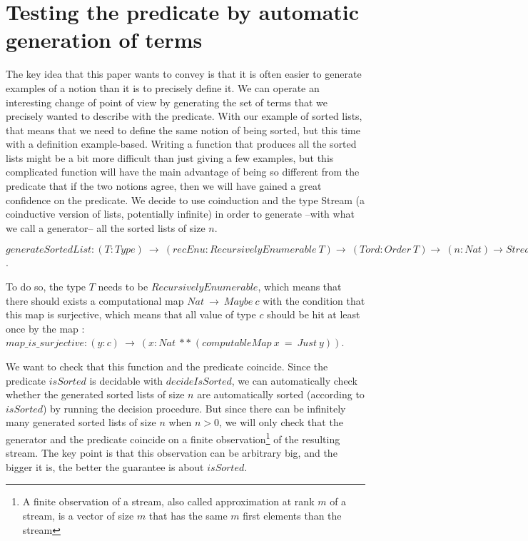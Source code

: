 \section{Testing the predicate by automatic generation of terms}

\label{sect:testingInside}

The key idea that this paper wants to convey is that it is often easier to generate examples of a notion than it is to precisely define it. We can operate an interesting change of point of view by generating the set of terms that we precisely wanted to describe with the predicate. With our example of sorted lists, that means that we need to define the same notion of being sorted, but this time with a definition example-based. Writing a function that produces all the sorted lists might be a bit more difficult than just giving a few examples, but this complicated function will have the main advantage of being so different from the predicate that if the two notions agree, then we will have gained a great confidence on the predicate. We decide to use coinduction and the type Stream (a coinductive version of lists, potentially infinite) in order to generate --with what we call a generator-- all the sorted lists of size $n$.

$generateSortedList : (T:Type)\ \rightarrow\ (recEnu:RecursivelyEnumerable\ T) \rightarrow\ (Tord : Order\ T) \rightarrow\ (n:Nat) \rightarrow Stream\ (List\ T)$.

To do so, the type $T$ needs to be $RecursivelyEnumerable$, which means that there should exists a computational map $Nat\ \rightarrow\ Maybe\ c$ with the condition that this map is surjective, which means that all value of type $c$ should be hit at least once by the map : $map\_is\_surjective : (y:c)\ \rightarrow\ (x:Nat\ **\ (computableMap\ x\ =\ Just\ y))$.

We want to check that this function and the predicate coincide. Since the predicate $isSorted$ is decidable with $decideIsSorted$, we can automatically check whether the generated sorted lists of size $n$ are automatically sorted (according to $isSorted$) by running the decision procedure. But since there can be infinitely many generated sorted lists of size $n$ when $n > 0$, we will only check that the generator and the predicate coincide on a finite observation\footnote{A finite observation of a stream, also called approximation at rank $m$ of a stream, is a vector of size $m$ that has the same $m$ first elements than the stream} of the resulting stream. The key point is that this observation can be arbitrary big, and the bigger it is, the better the guarantee is about $isSorted$.

